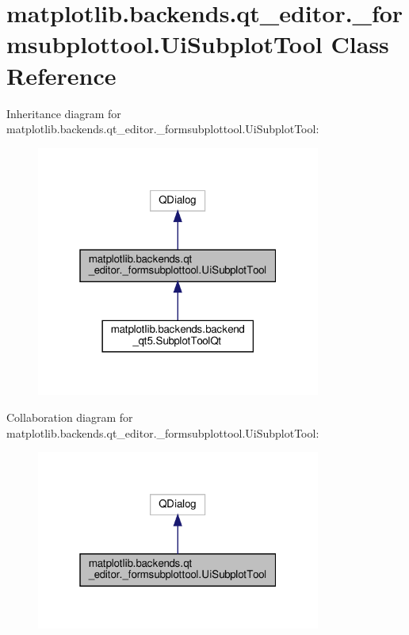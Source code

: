 \hypertarget{classmatplotlib_1_1backends_1_1qt__editor_1_1__formsubplottool_1_1UiSubplotTool}{}\section{matplotlib.\+backends.\+qt\+\_\+editor.\+\_\+formsubplottool.\+Ui\+Subplot\+Tool Class Reference}
\label{classmatplotlib_1_1backends_1_1qt__editor_1_1__formsubplottool_1_1UiSubplotTool}


Inheritance diagram for matplotlib.\+backends.\+qt\+\_\+editor.\+\_\+formsubplottool.\+Ui\+Subplot\+Tool\+:
\nopagebreak
\begin{figure}[H]
\begin{center}
\leavevmode
\includegraphics[width=265pt]{classmatplotlib_1_1backends_1_1qt__editor_1_1__formsubplottool_1_1UiSubplotTool__inherit__graph}
\end{center}
\end{figure}


Collaboration diagram for matplotlib.\+backends.\+qt\+\_\+editor.\+\_\+formsubplottool.\+Ui\+Subplot\+Tool\+:
\nopagebreak
\begin{figure}[H]
\begin{center}
\leavevmode
\includegraphics[width=265pt]{classmatplotlib_1_1backends_1_1qt__editor_1_1__formsubplottool_1_1UiSubplotTool__coll__graph}
\end{center}
\end{figure}
